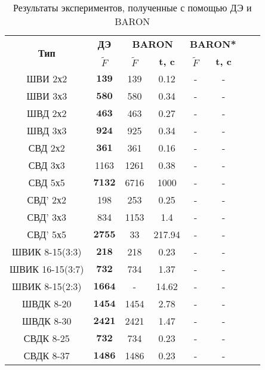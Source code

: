 \documentclass{llncs}
\begin{document}
\begin{table}[!h]

\centering
\caption{ Результаты экспериментов, полученные с помощью ДЭ и BARON}
\begin{tabular}{|c|c|c c|c c|c c|}
    \hline
    \multirow{2}{*}{\textbf{Тип}} & \textbf{ДЭ} & \multicolumn{2}{|c|}{\textbf{BARON}} & \multicolumn{2}{|c|}{\textbf{BARON*}}\\
    & \textbf{$\tilde{F}$} & \textbf{$\tilde{F}$} & \textbf{t, c} & \textbf{$\tilde{F}$} & \textbf{t, c} \\
    \hline
    ШВИ 2х2         & $\mathbf{139}$   & 139    & 0.12     & -       & -   \\
    ШВИ 3х3         & $\mathbf{580}$   & 580    & 0.34     & -       & -     \\
    ШВД 2х2         & $\mathbf{463}$   & 463    & 0.27     & -       & -  \\
    ШВД 3х3         & $\mathbf{924}$   & 925    & 0.34     & -       & -     \\
    СВД 2х2         & $\mathbf{361}$   & 361    & 0.16     & -       & -     \\
    СВД 3х3        & 1163  & 1261   & 0.38     & -       & -     \\
    СВД 5х5         & $\mathbf{7132}$  & 6716   & 1000     & -       & -     \\
    СВД' 2х2       & 198   & 253    & 0.25     & -       & -     \\
    СВД' 3х3       & 834   & 1153   & 1.4      & -       & -     \\
    СВД' 5х5        & $\mathbf{2755}$  & 33     & 217.94   & -       & -     \\
    ШВИК 8-15(3:3)  & $\mathbf{218}$   & 218    & 0.23     & -       & -     \\
    ШВИК 16-15(3:7) & $\mathbf{732}$   & 734    & 1.37     & -       & -     \\
    ШВИК 8-15(2:3)  & $\mathbf{1664}$     & -   & 14.62    & -       & -     \\
    ШВДК 8-20       & $\mathbf{1454}$  & 1454   & 2.78     & -       & -     \\
    ШВДК 8-30       & $\mathbf{2421}$  & 2421   & 1.47     & -       & -     \\
    СВДК 8-25       & $\mathbf{732}$   & 734    & 0.23     & -       & -     \\
    СВДК 8-37       & $\mathbf{1486}$  & 1486   & 0.23     & -       & -     \\
    \hline
\end{tabular}
\label{tab:results_de}
\end{table}
\end{document}
